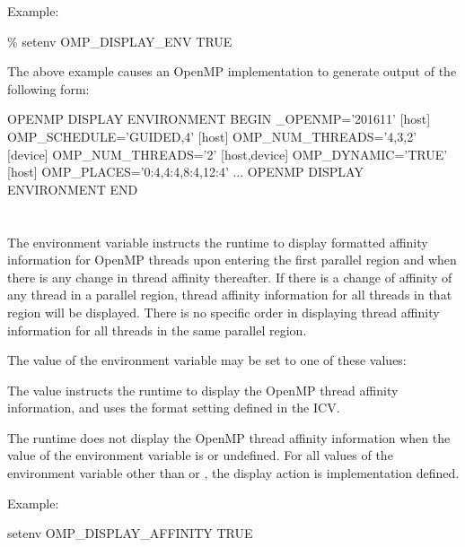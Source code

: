 Example: 
\begin{boxedcode}
\% setenv OMP\_DISPLAY\_ENV TRUE
\end{boxedcode}

The above example causes an OpenMP implementation to generate output of the 
following form:

\begin{boxedcode}
OPENMP DISPLAY ENVIRONMENT BEGIN
  \_OPENMP='201611'
  [host] OMP\_SCHEDULE='GUIDED,4'
  [host] OMP\_NUM\_THREADS='4,3,2'
  [device] OMP\_NUM\_THREADS='2'
  [host,device] OMP\_DYNAMIC='TRUE'
  [host] OMP\_PLACES='{0:4},{4:4},{8:4},{12:4}'
  ...
OPENMP DISPLAY ENVIRONMENT END
\end{boxedcode}


\section{}
\label{sec:OMP_DISPLAY_AFFINITY}
The  environment variable instructs the runtime to display formatted 
affinity information for OpenMP threads upon entering the first parallel region
 and when there is any change in thread affinity thereafter. 
If there is a change of affinity of any thread in a parallel region, thread affinity information for all threads
in that region will be displayed.  There is no specific order in displaying thread affinity information
for all threads in the same parallel region. 

The value of the  environment variable may be set to one of these 
values:



The  value instructs the runtime to display the OpenMP thread affinity information, and uses the 
format setting defined in the  ICV. 

The runtime does not display the OpenMP thread affinity information when the value of the 
environment variable is  or undefined. For all values of the environment
variable other than  or , the display action is implementation defined.

Example: 
\begin{boxedcode}
setenv OMP\_DISPLAY\_AFFINITY TRUE
\end{boxedcode}

